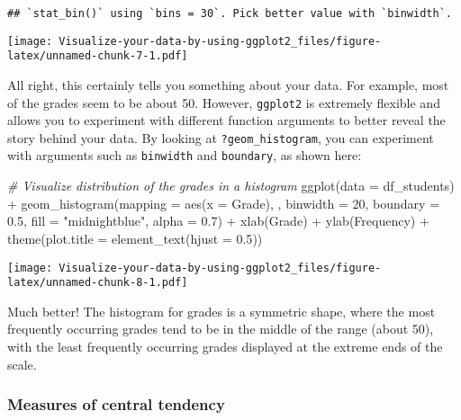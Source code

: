 \documentclass[
]{article}
\newenvironment{Shaded}{\begin{snugshade}}{\end{snugshade}}
\newcommand{\AttributeTok}[1]{\textcolor[rgb]{0.77,0.63,0.00}{#1}}
\newcommand{\CommentTok}[1]{\textcolor[rgb]{0.56,0.35,0.01}{\textit{#1}}}
\newcommand{\DecValTok}[1]{\textcolor[rgb]{0.00,0.00,0.81}{#1}}
\newcommand{\FloatTok}[1]{\textcolor[rgb]{0.00,0.00,0.81}{#1}}
\newcommand{\FunctionTok}[1]{\textcolor[rgb]{0.00,0.00,0.00}{#1}}
\newcommand{\NormalTok}[1]{#1}
\newcommand{\SpecialCharTok}[1]{\textcolor[rgb]{0.00,0.00,0.00}{#1}}
\newcommand{\StringTok}[1]{\textcolor[rgb]{0.31,0.60,0.02}{#1}}
\begin{document}
\begin{verbatim}
## `stat_bin()` using `bins = 30`. Pick better value with `binwidth`.
\end{verbatim}

\texttt{[image: Visualize-your-data-by-using-ggplot2\_files/figure-latex/unnamed-chunk-7-1.pdf]}

All right, this certainly tells you something about your data. For
example, most of the grades seem to be about 50. However,
\texttt{ggplot2} is extremely flexible and allows you to experiment with
different function arguments to better reveal the story behind your
data. By looking at \texttt{?geom\_histogram}, you can experiment with
arguments such as \texttt{binwidth} and \texttt{boundary}, as shown
here:

\begin{Shaded}
\begin{Highlighting}[]
\CommentTok{\# Visualize distribution of the grades in a histogram}
\FunctionTok{ggplot}\NormalTok{(}\AttributeTok{data =}\NormalTok{ df\_students) }\SpecialCharTok{+}
  \FunctionTok{geom\_histogram}\NormalTok{(}\AttributeTok{mapping =} \FunctionTok{aes}\NormalTok{(}\AttributeTok{x =}\NormalTok{ Grade), , }\AttributeTok{binwidth =} \DecValTok{20}\NormalTok{, }\AttributeTok{boundary =} \FloatTok{0.5}\NormalTok{, }\AttributeTok{fill =} \StringTok{"midnightblue"}\NormalTok{, }\AttributeTok{alpha =} \FloatTok{0.7}\NormalTok{) }\SpecialCharTok{+}
  \FunctionTok{xlab}\NormalTok{(}\StringTok{\textquotesingle{}Grade\textquotesingle{}}\NormalTok{) }\SpecialCharTok{+}
  \FunctionTok{ylab}\NormalTok{(}\StringTok{\textquotesingle{}Frequency\textquotesingle{}}\NormalTok{) }\SpecialCharTok{+}
  \FunctionTok{theme}\NormalTok{(}\AttributeTok{plot.title =} \FunctionTok{element\_text}\NormalTok{(}\AttributeTok{hjust =} \FloatTok{0.5}\NormalTok{))}
\end{Highlighting}
\end{Shaded}

\texttt{[image: Visualize-your-data-by-using-ggplot2\_files/figure-latex/unnamed-chunk-8-1.pdf]}

Much better! The histogram for grades is a symmetric shape, where the
most frequently occurring grades tend to be in the middle of the range
(about 50), with the least frequently occurring grades displayed at the
extreme ends of the scale.

\hypertarget{measures-of-central-tendency}{%
\subsubsection{Measures of central
tendency}\label{measures-of-central-tendency}}
\end{document}
